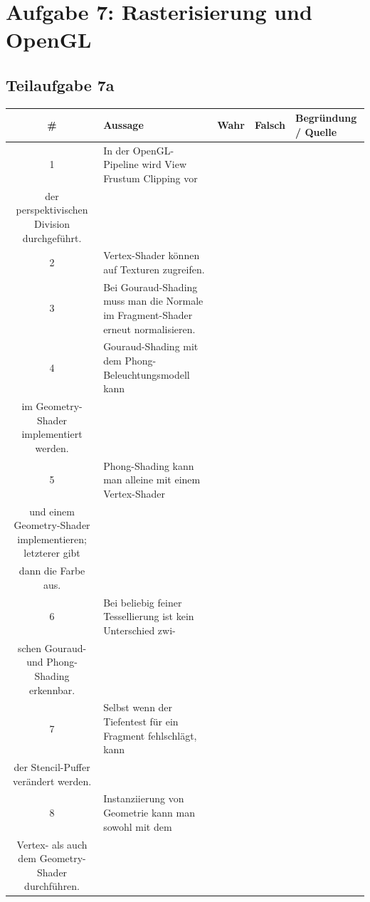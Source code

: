\documentclass[a4paper]{scrartcl}
\begin{document}
\section*{Aufgabe 7: Rasterisierung und OpenGL}
\subsection*{Teilaufgabe 7a}
\begin{tabular}{cp{8cm}llp{4cm}}\toprule
\# & Aussage & Wahr & Falsch & Begründung / Quelle \\\midrule
 1 & In der OpenGL-Pipeline wird View Frustum Clipping vor\\der perspektivischen Division durchgeführt.                                    & ~    & ~      & ~                   \\
 2 & Vertex-Shader können auf Texturen zugreifen.                                                                                          & ~    & ~      & ~                   \\
 3 & Bei Gouraud-Shading muss man die Normale im Fragment-Shader erneut normalisieren.                                                     & ~    & ~      & ~                   \\
 4 & Gouraud-Shading mit dem Phong-Beleuchtungsmodell kann\\im Geometry-Shader implementiert werden.                                       & ~    & ~      & ~                   \\
 5 & Phong-Shading kann man alleine mit einem Vertex-Shader\\und einem Geometry-Shader implementieren; letzterer gibt\\dann die Farbe aus. & ~    & ~      & ~                   \\
 6 & Bei beliebig feiner Tessellierung ist kein Unterschied zwi-\\schen Gouraud- und Phong-Shading erkennbar.                              & ~    & ~      & ~                   \\
 7 & Selbst wenn der Tiefentest für ein Fragment fehlschlägt, kann\\der Stencil-Puffer verändert werden.                                   & ~    & ~      & ~                   \\
 8 & Instanziierung von Geometrie kann man sowohl mit dem\\Vertex- als auch dem Geometry-Shader durchführen.                               & ~    & ~      & ~                   \\\bottomrule
\end{tabular}
\end{document}
